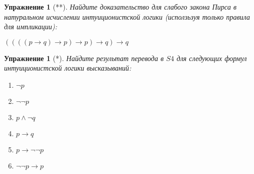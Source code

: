 \documentclass[11pt]{article}
\newtheorem{exercise}[theorem]{Упражнение}
\begin{document}
\begin{exercise}[**] Найдите доказательство для слабого закона Пирса в натуральном исчислении интуиционистской логики (исползьзуя только правила для импликации):
\begin{center}
    $((((p\to q) \to p) \to p) \to q) \to q $
\end{center}

\end{exercise}

\begin{exercise}[*] Найдите результат перевода в $S4$ для следующих формул интуиционистской логики высказываний:
\begin{multicols}{3}
\begin{enumerate}
\item $\neg p$	
\item $\neg \neg p$	
\item $p \wedge \neg q$
\item $p \to q$
\item $p \to \neg \neg p$
\item $\neg \neg p \to p  $
\end{enumerate}
\end{multicols}	
\end{exercise}
\end{document}
